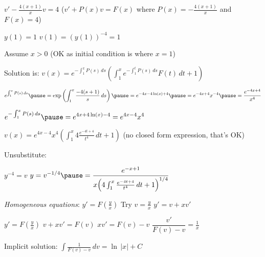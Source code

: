 \documentclass[10pt,aspectratio=169]{beamer}
\begin{document}
\begin{frame}

$v'- \frac{4(x+1)}{x} v  = 4$
\quad
($v' + P(x) v = F(x)$ where $P(x) = - \frac{4(x+1)}{x}$ and $F(x) = 4$)

\medskip
\pause

$y(1) = 1$ \wthus $v(1) = {(y(1))}^{-4} = 1$

\medskip
\pause

Assume $x > 0$ (OK as initial condition is where $x = 1$)

\medskip
\pause

Solution is:
\qquad
$\displaystyle
v(x) = e^{-\int_1^x P(s) \, ds} \left(
\int_1^x 
e^{-\int_1^t P(s) \, ds}
F(t) \, dt
+
1 \right)$

\medskip
\pause

$\displaystyle
e^{\int_1^x P(s)\,ds}
\pause
= \exp \left( \int_1^x \frac{-4(s+1)}{s} \,ds \right)
\pause
=
e^{-4x-4\ln(x)+4}
\pause
= 
e^{-4x+4} x^{-4}
\pause
=
\frac{e^{-4x+4}}{x^4}$

\medskip
\pause

$\displaystyle
e^{-\int_1^x P(s)\,ds}
\pause
=
e^{4x+4\ln(x)-4}
= 
e^{4x-4} x^4$

\medskip
\pause

\thus \quad
$\displaystyle
v(x)
=
e^{4x-4} x^4
\left( \int_{1}^x 4 \frac{e^{-4t+4}}{t^4} \,dt
+ 1 \right)$
\qquad
\pause
(no closed form expression, that's OK)

\medskip
\pause

Unsubstitute:
\medskip

\quad
$y^{-4} = v$
\pause
\wthus
$\displaystyle
y = v^{-1/4}
\pause
= \frac{e^{-x+1}}{x {\left( 4 \int_1^x \frac{e^{-4t+4}}{t^4} \,dt + 1\right)}^{1/4}}$

\end{frame}

\begin{frame}

\emph{Homogeneous equations}:
\quad
$y' = F\left(\frac{y}{x}\right)$
\pause
\quad
Try
$v = \frac{y}{x}$
\pause
\qquad
$y' = v + x v'$

\medskip
\pause

$y' = F\left(\frac{y}{x}\right)$
\wthus
$v+ xv' = F(v)$
\pause
\wthus
$xv' = F(v)-v$
\pause
\wthus
$\dfrac{v'}{F(v)-v} = \frac{1}{x}$

\medskip
\pause

Implicit solution:
\quad
$\displaystyle
\int \frac{1}{F(v)-v} \,dv = \ln \, \lvert x \rvert + C$

\end{frame}
\end{document}
